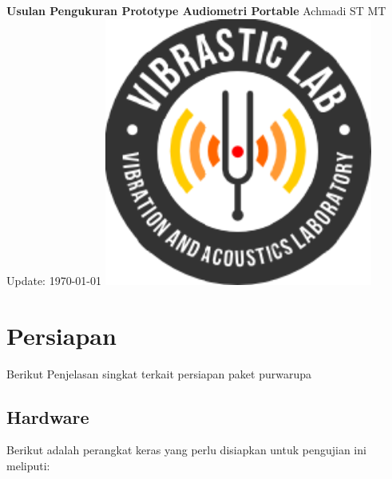\documentclass[12pt]{book}
\date{}
\begin{document}
    \frontmatter
	\begin{titlepage}
		\centering
		{\LARGE \bf Usulan Pengukuran Prototype Audiometri Portable}
		\vfill
		{\Large Achmadi ST MT}
		\vfill
		Update: {\today}
		\vfill
		\includegraphics[width=250pt]{images/logo/logoviblab}
		\vfill
		\vfill
		\vfill
	\end{titlepage}


	\newpage
	\tableofcontents
	\listoffigures
	\listoftables


    \mainmatter
    \newpage

	\chapter{Persiapan}

    Berikut Penjelasan singkat terkait persiapan paket purwarupa

	\section{Hardware}

    Berikut adalah perangkat keras yang perlu disiapkan untuk pengujian ini meliputi:
\end{document}

